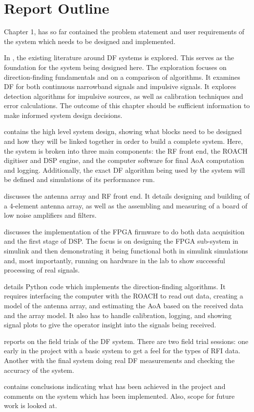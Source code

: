 \section{Report Outline}
Chapter 1, has so far contained the problem statement and user requirements of the system which needs to be designed and implemented. 

In , the existing literature around DF systems is explored. This serves as the foundation for the system being designed here. The exploration focuses on direction-finding fundamentals and on a comparison of algorithms. It examines DF for both continuous narrowband signals and impulsive signals. It explores detection algorithms for impulsive sources, as well as calibration techniques and error calculations. The outcome of this chapter should be sufficient information to make informed system design decisions.

 contains the high level system design, showing what blocks need to be designed and how they will be linked together in order to build a complete system. Here, the system is broken into three main components: the RF front end, the ROACH digitiser and DSP engine, and the computer software for final AoA computation and logging. Additionally, the exact DF algorithm being used by the system will be defined and simulations of its performance run.

 discusses the antenna array and RF front end. It details designing and building of a 4-element antenna array, as well as the assembling and measuring of a board of low noise amplifiers and filters.

 discusses the implementation of the FPGA firmware to do both data acquisition and the first stage of DSP. The focus is on designing the FPGA sub-system in simulink and then demonstrating it being functional both in simulink simulations and, most importantly, running on hardware in the lab to show successful processing of real signals.

 details Python code which implements the direction-finding algorithms. It requires interfacing the computer with the ROACH to read out data, creating a model of the antenna array, and estimating the AoA based on the received data and the array model. It also has to handle calibration, logging, and showing signal plots to give the operator insight into the signals being received.

 reports on the field trials of the DF system. There are two field trial sessions: one early in the project with a basic system to get a feel for the types of RFI data. Another with the final system doing real DF measurements and checking the accuracy of the system.

 contains conclusions indicating what has been achieved in the project and comments on the system which has been implemented. Also, scope for future work is looked at.
